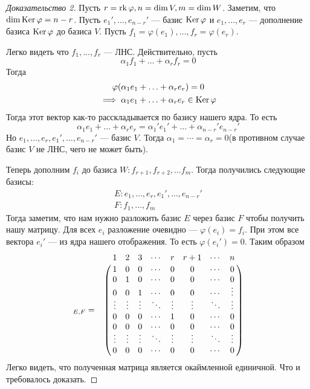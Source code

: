 \documentclass[../main.tex]{subfiles}
\begin{document}
\begin{proof}[Доказательство 2]
  Пусть $r = \operatorname{rk} \varphi, n = \dim V, m = \dim W$. Заметим, что $\dim \operatorname{Ker} \varphi = n - r$. Пусть $e_1', \dotsc, e_{n - r}'$ --- базис $\operatorname{Ker} \varphi$ и $e_1, \dotsc, e_r$ --- дополнение базиса $\operatorname{Ker} \varphi$ до базиса $V$.
  Пусть $f_1 = \varphi(e_1), \dotsc, f_r = \varphi(e_r)$.

  Легко видеть что $f_1, \dotsc, f_r$ --- ЛНС. Действительно, пусть
  \begin{equation*}
    \alpha_1 f_1 + \dotsc + \alpha_r f_r = 0
  \end{equation*}
  Тогда
  \begin{equation*}
    \begin{gathered}
      \varphi(\alpha_1 e_1 + \dotsc + \alpha_r e_r) = 0 \\
      \implies \alpha_1 e_1 + \dotsc + \alpha_r e_r \in \operatorname{Ker} \varphi
    \end{gathered}
  \end{equation*}
  Тогда этот вектор как-то расскладывается по базису нашего ядра. То есть
  \begin{equation*}
    \alpha_1 e_1 + \dotsc + \alpha_r e_r = \alpha_1' e_1' + \dotsc + \alpha_{n - r}' e_{n - r}'
  \end{equation*}
  Но $e_1, \dotsc, e_r, e_1', \dotsc, e_{n - r}'$ --- базис $V$. Тогда $\alpha_1 = \dotsb = \alpha_r = 0$(в противном случае базис $V$ не ЛНС, чего не может быть).

  Теперь дополним $f_i$ до базиса $W\colon f_{r + 1}, f_{r + 2}, \dotsc f_m$. Тогда получились следующие базисы:
  \begin{equation*}
    \begin{gathered}
      E\colon e_1, \dotsc, e_r, e_1', \dotsc, e_{n - r}' \\
      F\colon f_1, \dotsc, f_m
    \end{gathered}
  \end{equation*}
  Тогда заметим, что нам нужно разложить базис $E$ через базис $F$ чтобы получить нашу матрицу. Для всех $e_i$ разложение очевидно --- $\varphi(e_i) = f_i$. При этом все вектора $e_i'$ --- из ядра нашего отображения. То есть $\varphi(e_i') = 0$. Таким образом
  \begin{equation*}
    [\varphi]_{E, F}
    =
    \bordermatrix{
      ~ & 1 & 2 & 3 & \cdots & r & r + 1 & \cdots & n \cr
      ~ & 1 & 0 & 0 & \cdots & 0 & 0 & \cdots & 0 \cr
      ~ & 0 & 1 & 0 & \cdots & 0 & 0 & \cdots & 0 \cr
      ~ & 0 & 0 & 1 & \cdots & 0 & 0 & \cdots & \vdots \cr
      ~ & \vdots & \vdots & \vdots & \ddots & \vdots & \vdots & \ddots & \vdots \cr
      ~ & 0 & 0 & 0 & \cdots & 1 & 0 & \cdots & 0 \cr
      ~ & 0 & 0 & 0 & \cdots & 0 & 0 & \cdots & 0 \cr
      ~ & \vdots & \vdots & \vdots & \ddots & \vdots & \vdots & \ddots & \vdots \cr
      ~ & 0 & 0 & 0 & \cdots & 0 & 0 & \cdots & 0
    }
  \end{equation*}
  Легко видеть, что полученная матрица является окаймленной единичной. Что и требовалось доказать.
\end{proof}
\end{document}
